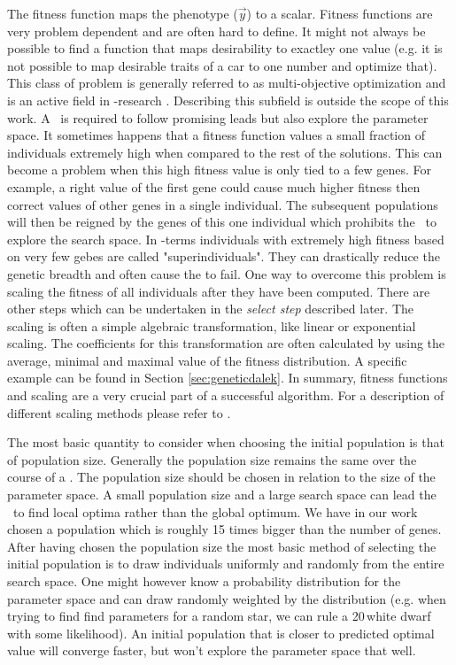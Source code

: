 The fitness function maps the phenotype ($\vec{y}$) to a scalar. Fitness functions are very problem dependent and are often hard to define. It might not always be possible to find a function that maps desirability to exactley one value (e.g. it is not possible to map desirable traits of a car to one number and optimize that). This class of problem is generally referred to as multi-objective optimization and is an active field in \ga-research \citep{citeulike:1300532}. Describing this subfield is outside the scope of this work. A \ga\ is required to follow promising leads but also explore the parameter space. It sometimes happens that a fitness function values a small fraction of individuals extremely high when compared to the rest of the solutions. This can become a problem when this high fitness value is only tied to a few genes. For example, a right value of the first gene could cause much higher fitness then correct values of other genes in a single individual. The subsequent populations will then be reigned by the genes of this one individual which prohibits the \ga\ to explore the search space.  In \ga-terms individuals with extremely high fitness based on very few gebes are called "superindividuals". They can drastically reduce the genetic breadth and often cause the \ga to fail. One way to overcome this problem is scaling the fitness of all individuals after they have been computed. There are other steps which can be undertaken in the \textit{select step} described later. The scaling is often a simple algebraic transformation, like linear or exponential scaling. The coefficients for this transformation are often calculated by using the average, minimal and maximal value of the fitness distribution. A specific example can be found in Section \ref{sec:geneticdalek}. In summary, fitness functions and scaling are a very crucial part of a successful algorithm. For a description of different scaling methods please refer to \citet{Kreinovich93geneticalgorithms}.

The most basic quantity to consider when choosing the initial population is that of population size. Generally the population size remains the same over the course of a \ga. The population size should be chosen in relation to the size of the parameter space. A small population size and a large search space can lead the \ga\ to find local optima rather than the global optimum. We have in our work chosen a population which is roughly 15 times bigger than the number of genes. After having chosen the population size the most basic method of selecting the initial population is to draw individuals uniformly and randomly from the entire search space. One might however know a probability distribution for the parameter space and can draw randomly weighted by the distribution (e.g. when trying to find find parameters for a random star, we can rule a 20\,\msun white dwarf with some likelihood). An initial population that is closer to predicted optimal value will converge faster, but won't explore the parameter space that well. 

